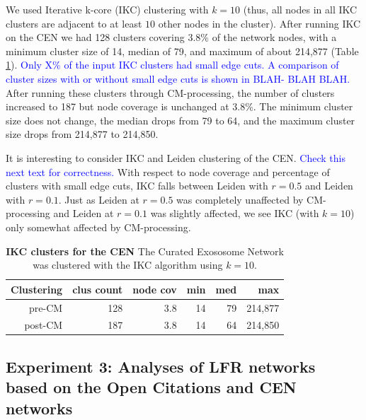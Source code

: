 \documentclass[11pt]{article}   	%
\begin{document}
 

We used Iterative k-core (IKC) clustering with $k=10$ (thus, all nodes in all  IKC clusters are adjacent to at least $10$ other nodes in the cluster). 
After running IKC on the CEN we had 128 clusters covering 3.8\% of the network nodes, with a minimum cluster size of 14, median of 79, and maximum of about 214,877 (Table \ref{tab:IKC-11-CEN-basicstats}). 
\textcolor{blue}{Only X\% of the input IKC clusters had small edge cuts. 
 A comparison of cluster sizes with or without small edge cuts is shown in BLAH- BLAH BLAH.}
 After running these clusters through CM-processing, the number of clusters increased to 187 but node coverage is unchanged at 3.8\%.   The  minimum cluster size does not change, the median drops from 79 to 64, and the maximum cluster size drops from 214,877 to 214,850. 

It is interesting to consider IKC and Leiden clustering of the CEN. 
\textcolor{blue}{Check this next text for correctness.}
With respect to node coverage and percentage of clusters with small edge cuts, IKC falls between Leiden with $r=0.5$ and Leiden with $r=0.1$.  
Just as Leiden at $r=0.5$ was completely unaffected by CM-processing and Leiden at $r=0.1$ was slightly affected, 
we see IKC (with $k=10$) only somewhat affected by CM-processing. 



\begin{table}[ht]
\centering
\begin{tabular}{rrrrrr}
  \hline
Clustering & clus count & node cov & min & med & max       \\ \hline
pre-CM       & 128         & 3.8       & 14  & 79  & 214,877 \\
post-CM & 187 & 3.8 & 14 & 64 & 214,850\\
  \hline
\end{tabular}
\caption[IKC clusters pre- and post-CM processing for the CEN]{\textbf{IKC clusters  for the CEN}
The Curated Exososome Network was clustered with the IKC algorithm using  $k=10$.
}
\label{tab:IKC-11-CEN-basicstats}
\end{table}



\subsection{Experiment 3: Analyses of LFR networks based on the Open Citations and CEN networks}
\end{document}
